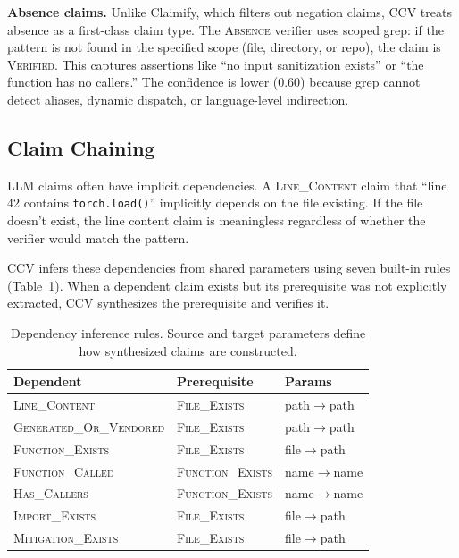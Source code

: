 \textbf{Absence claims.} Unlike Claimify, which filters out negation claims, CCV treats absence as a first-class claim type. The \textsc{Absence} verifier uses scoped grep: if the pattern is not found in the specified scope (file, directory, or repo), the claim is \textsc{Verified}. This captures assertions like ``no input sanitization exists'' or ``the function has no callers.'' The confidence is lower (0.60) because grep cannot detect aliases, dynamic dispatch, or language-level indirection.

\subsection{Claim Chaining}

LLM claims often have implicit dependencies. A \textsc{Line\_Content} claim that ``line 42 contains \texttt{torch.load()}'' implicitly depends on the file existing. If the file doesn't exist, the line content claim is meaningless regardless of whether the verifier would match the pattern.

CCV infers these dependencies from shared parameters using seven built-in rules (Table~\ref{tab:chaining}). When a dependent claim exists but its prerequisite was not explicitly extracted, CCV synthesizes the prerequisite and verifies it.

\begin{table}[t]
\centering
\caption{Dependency inference rules. Source and target parameters define how synthesized claims are constructed.}
\label{tab:chaining}
\small
\begin{tabular}{lll}
\toprule
\textbf{Dependent} & \textbf{Prerequisite} & \textbf{Params} \\
\midrule
\textsc{Line\_Content} & \textsc{File\_Exists} & path$\to$path \\
\textsc{Generated\_Or\_Vendored} & \textsc{File\_Exists} & path$\to$path \\
\textsc{Function\_Exists} & \textsc{File\_Exists} & file$\to$path \\
\textsc{Function\_Called} & \textsc{Function\_Exists} & name$\to$name \\
\textsc{Has\_Callers} & \textsc{Function\_Exists} & name$\to$name \\
\textsc{Import\_Exists} & \textsc{File\_Exists} & file$\to$path \\
\textsc{Mitigation\_Exists} & \textsc{File\_Exists} & file$\to$path \\
\bottomrule
\end{tabular}
\end{table}

